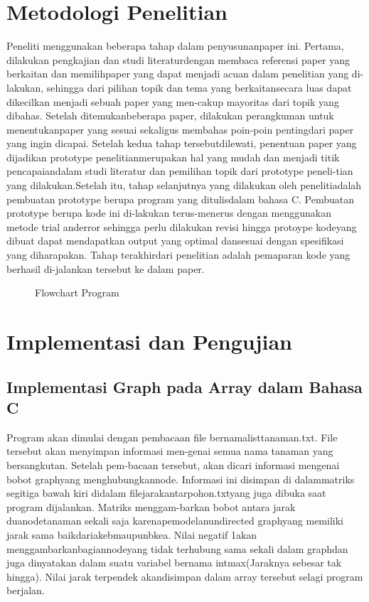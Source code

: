 \documentclass[conference]{IEEEtran}
\begin{document}
\section{Metodologi Penelitian}
Peneliti  menggunakan  beberapa  tahap  dalam  penyusunanpaper  ini.  Pertama,  dilakukan  pengkajian  dan  studi  literaturdengan membaca referensi paper yang berkaitan dan memilihpaper  yang  dapat  menjadi  acuan  dalam  penelitian  yang  di-lakukan, sehingga dari pilihan topik dan tema yang berkaitansecara luas dapat dikecilkan menjadi sebuah paper yang men-cakup  mayoritas  dari  topik  yang  dibahas.  Setelah  ditemukanbeberapa  paper,  dilakukan  perangkuman  untuk  menentukanpaper  yang  sesuai  sekaligus  membahas  poin-poin  pentingdari  paper  yang  ingin  dicapai.  Setelah  kedua  tahap  tersebutdilewati, penentuan paper yang dijadikan prototype penelitianmerupakan  hal  yang  mudah  dan  menjadi  titik  pencapaiandalam studi literatur dan pemilihan topik dari prototype peneli-tian yang dilakukan.Setelah  itu,  tahap  selanjutnya  yang  dilakukan  oleh  penelitiadalah   pembuatan   prototype   berupa   program   yang   ditulisdalam  bahasa  C.  Pembuatan  prototype  berupa  kode  ini  di-lakukan terus-menerus dengan menggunakan metode trial anderror  sehingga  perlu  dilakukan  revisi  hingga  protoype  kodeyang  dibuat  dapat  mendapatkan  output  yang  optimal  dansesuai  dengan  spesifikasi  yang  diharapakan.  Tahap  terakhirdari   penelitian   adalah   pemaparan   kode   yang   berhasil   di-jalankan tersebut ke dalam paper.

\begin{figure}[htbp]
	\centering
	\resizebox{0.5\textwidth}{!}{}
	\caption{Flowchart Program}
\end{figure}

\section{Implementasi dan Pengujian}

\subsection{Implementasi Graph pada Array dalam Bahasa C}
Program  akan  dimulai  dengan  pembacaan  file  bernamalisttanaman.txt. File tersebut akan menyimpan informasi men-genai semua nama tanaman yang bersangkutan. Setelah pem-bacaan tersebut, akan dicari informasi mengenai bobot graphyang menghubungkannode. Informasi ini disimpan di dalammatriks  segitiga  bawah  kiri  didalam  filejarakantarpohon.txtyang juga dibuka saat program dijalankan. Matriks menggam-barkan bobot antara jarak duanodetanaman sekali saja karenapemodelanundirected graphyang  memiliki  jarak  sama  baikdariakebmaupunbkea.  Nilai negatif 1akan  menggambarkanbagiannodeyang  tidak  terhubung  sama  sekali  dalam  graphdan  juga  dinyatakan  dalam  suatu  variabel  bernama  intmax(Jaraknya  sebesar  tak  hingga).  Nilai  jarak  terpendek  akandisimpan dalam array tersebut selagi program berjalan.
\end{document}
